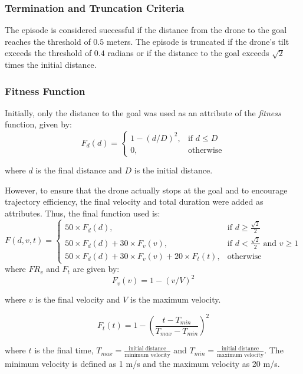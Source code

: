 \documentclass[12pt]{article}
\theoremstyle{definition}
\begin{document}
\subsubsection{Termination and Truncation Criteria}
The episode is considered successful if the distance from the drone to the goal reaches the threshold of $0.5$ meters. \newline
The episode is truncated if the drone’s tilt exceeds the threshold of $0.4$ radians or if the distance to the goal exceeds $\sqrt{2}$ times the initial distance.

\subsubsection{Fitness Function}
Initially, only the distance to the goal was used as an attribute of the \textit{fitness} function, given by:
\[
F_d(d)=
\begin{cases}
     1 - (d/D)^2, & \text{if } d \leq D\\
     0,           & \text{otherwise}
\end{cases}
\]
\begin{center}
    where $d$ is the final distance and $D$ is the initial distance.
\end{center}
However, to ensure that the drone actually stops at the goal and to encourage trajectory efficiency, the final velocity and total duration were added as attributes. Thus, the final function used is:
\[
F(d, v, t)=
\begin{cases}
     50 \times F_d(d),                                       & \text{if } d \geq \frac{\sqrt{2}}{2}\\
     50 \times F_d(d) + 30 \times F_v(v),                    & \text{if } d < \frac{\sqrt{2}}{2} \text{ and } v \geq 1\\
     50 \times F_d(d) + 30 \times F_v(v) + 20 \times F_t(t), & \text{otherwise}
\end{cases}
\]
where $FR_v$ and $F_t$ are given by:
\[
F_v(v)=1 - (v/V)^2
\]
\begin{center}
    where $v$ is the final velocity and $V$ is the maximum velocity.
\end{center}
\[
F_t(t)=1 - \left(\frac{t - T_{min}}{T_{max}-T_{min}}\right)^2
\]
\begin{center}
    where $t$ is the final time, $T_{max} = \frac{\text{initial distance}}{\text{minimum velocity}}$ and $T_{min} = \frac{\text{initial distance}}{\text{maximum velocity}}$. \newline
    The minimum velocity is defined as 1 m/s and the maximum velocity as 20 m/s.
\end{center}
\end{document}
